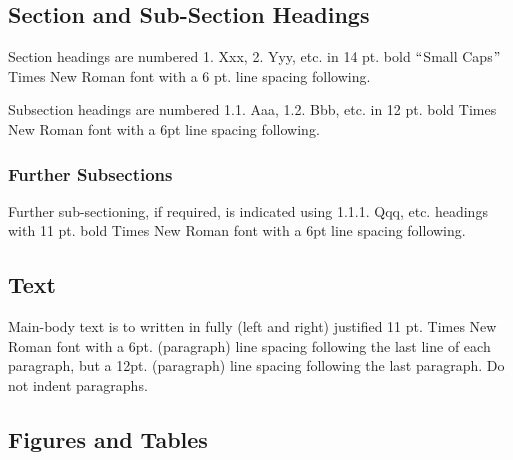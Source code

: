 \documentclass[11pt,twoside]{articleJJCIT}
\begin{document}
\subsection{Section and Sub-Section Headings}
Section headings are numbered 1. Xxx, 2. Yyy, etc. in 14 pt. bold $``$Small Caps$"$  Times New Roman font with a 6 pt. line spacing following. 

Subsection headings are numbered 1.1. Aaa, 1.2. Bbb, etc. in 12 pt. bold Times New Roman font with a 6pt line spacing following.

\subsubsection{Further Subsections}

 Further sub-sectioning, if required, is indicated using 1.1.1. Qqq, etc. headings with 11 pt. bold Times New Roman font with a 6pt line spacing following.
 
\subsection{Text}
Main-body text is to written in fully (left and right) justified 11 pt. Times New Roman font with a 6pt. (paragraph) line spacing following the last line of each paragraph, but a 12pt. (paragraph) line spacing following the last paragraph. Do not indent paragraphs.

\subsection{Figures and Tables}
 
\end{document}
